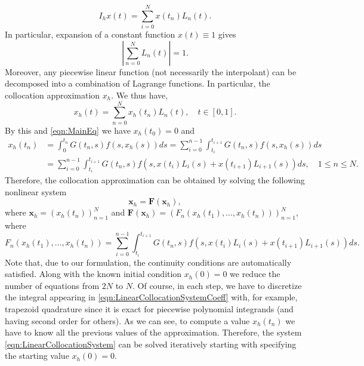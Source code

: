 \documentclass[12pt,a4paper]{article}
\begin{document}
\begin{equation}
	I_h x(t) = \sum_{i=0}^{N} x(t_n) L_n(t).
\end{equation}
In particular, expansion of a constant function $x(t) \equiv 1$ gives
\begin{equation}\label{eqn:LinearInterpolationConstant}
	\left|\sum_{n=0}^{N} L_n(t)\right| = 1.
\end{equation}
Moreover, any piecewise linear function (not necessarily the interpolant) can be decomposed into a combination of Lagrange functions. In particular, the collocation approximation $x_h$. We thus have,
\begin{equation}\label{eqn:LagrangeExpansion}
	x_h(t) = \sum_{n=0}^{N} x_h(t_n) L_n(t), \quad t \in [0,1].
\end{equation} 
By this and \eqref{eqn:MainEq} we have $x_h(t_0) = 0$ and 
\begin{equation}
	\begin{split}
		x_h(t_n) &= \int_0^{t_n} G(t_n, s) f(s, x_h(s)) ds = \sum_{i = 0}^{n-1} \int_{t_i}^{t_{i+1}} G(t_n, s) f(s, x_h(s)) ds \\
		&= \sum_{i = 0}^{n-1} \int_{t_i}^{t_{i+1}} G(t_n, s) f(s, x(t_i) L_i(s) + x(t_{i+1}) L_{i+1}(s)) ds, \quad 1 \leq n \leq N. 
	\end{split}
\end{equation}
Therefore, the collocation approximation can be obtained by solving the following nonlinear system
\begin{equation}\label{eqn:LinearCollocationSystem}
	\textbf{x}_h = \textbf{F}(\textbf{x}_h),
\end{equation}
where $\textbf{x}_h = (x_h(t_n))_{n=1}^N$ and $\textbf{F}(\textbf{x}_h) = \left(F_n(x_h(t_1), ..., x_h(t_n))\right)_{n=1}^N$, where
\begin{equation}\label{eqn:LinearCollocationSystemCoeff}
	F_n(x_h(t_1), ..., x_h(t_n)) = \sum_{i = 0}^{n-1} \int_{t_i}^{t_{i+1}} G(t_n, s) f(s, x(t_i) L_i(s) + x(t_{i+1}) L_{i+1}(s)) ds. 
\end{equation} 
Note that, due to our formulation, the continuity conditions are automatically satisfied. Along with the known initial condition $x_h(0) = 0$ we reduce the number of equations from $2N$ to $N$. Of course, in each step, we have to discretize the integral appearing in \eqref{eqn:LinearCollocationSystemCoeff} with, for example, trapezoid quadrature since it is exact for piecewise polynomial integrands (and having second order for others). As we can see, to compute a value $x_h(t_n)$ we have to know all the previous values of the approximation. Therefore, the system \eqref{eqn:LinearCollocationSystem} can be solved iteratively starting with specifying the starting value $x_h(0) = 0$. 
\end{document}
